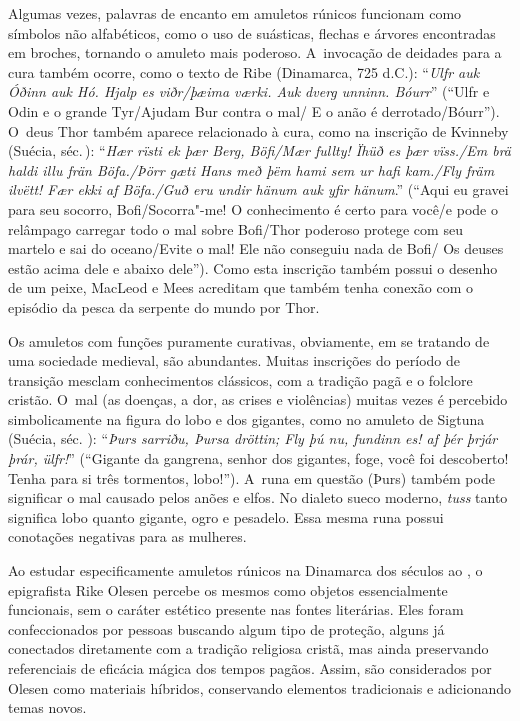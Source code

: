 Algumas vezes, palavras de encanto em amuletos rúnicos funcionam como
símbolos não alfabéticos, como o uso de suásticas, flechas e árvores
encontradas em broches, tornando o amuleto mais poderoso. A~invocação de
deidades para a cura também ocorre, como o texto de Ribe (Dinamarca, 725
d.C.): ``\emph{Ulfr auk Óðinn auk Hó. Hjalp es viðr/þæima værki. Auk
dverg unninn. Bóurr}'' (``Ulfr e Odin e o grande Tyr/Ajudam Bur contra o
mal/ E o anão é derrotado/Bóurr''). O~deus Thor também aparece
relacionado à cura, como na inscrição de Kvinneby (Suécia, séc.\,):
``\emph{Hær rïsti ek þær Berg, Böfi/Mær fullty! Ïhüð es þær vïss./Em brä
haldi illu frän Böfa./Þörr gæti Hans með þëm hami sem ur hafi kam./Fly
främ ilvëtt! Fær ekki af Böfa./Guð eru undir hänum auk yfir hänum}.''
(``Aqui eu gravei para seu socorro, Bofi/Socorra"-me! O conhecimento é
certo para você/e pode o relâmpago carregar todo o mal sobre Bofi/Thor
poderoso protege com seu martelo e sai do oceano/Evite o mal! Ele não
conseguiu nada de Bofi/ Os deuses estão acima dele e abaixo dele'').
Como esta inscrição também possui o desenho de um peixe, MacLeod e Mees
acreditam que também tenha conexão com o episódio da pesca da serpente
do mundo por Thor.

Os amuletos com funções puramente curativas, obviamente, em se tratando
de uma sociedade medieval, são abundantes. Muitas inscrições do período
de transição mesclam conhecimentos clássicos, com a tradição pagã e o
folclore cristão. O~mal (as doenças, a dor, as crises e violências)
muitas vezes é percebido simbolicamente na figura do lobo e dos
gigantes, como no amuleto de Sigtuna (Suécia, séc. ): ``\emph{Þurs sarriðu,
Þursa dröttin; Fly þú nu, fundinn es! af þér þrjár þrár, ülfr!}''
(``Gigante da gangrena, senhor dos gigantes, foge, você foi descoberto!
Tenha para si três tormentos, lobo!''). A~runa em questão (Þurs) também
pode significar o mal causado pelos anões e elfos. No dialeto sueco
moderno, \emph{tuss} tanto significa lobo quanto gigante, ogro e
pesadelo. Essa mesma runa possui conotações negativas para as mulheres.

Ao estudar especificamente amuletos rúnicos na Dinamarca dos séculos 
ao , o epigrafista Rike Olesen percebe os mesmos como objetos
essencialmente funcionais, sem o caráter estético presente nas fontes
literárias. Eles foram confeccionados por pessoas buscando algum tipo de
proteção, alguns já conectados diretamente com a tradição religiosa
cristã, mas ainda preservando referenciais de eficácia mágica dos tempos
pagãos. Assim, são considerados por Olesen como materiais híbridos,
conservando elementos tradicionais e adicionando temas novos.

